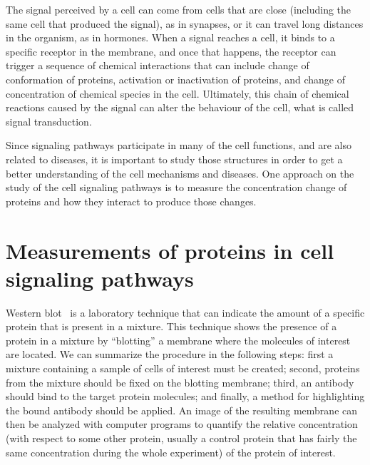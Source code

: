 The signal perceived by a cell can come from cells that are close 
(including the same cell that produced the signal), as in synapses, or 
it can travel long distances in the organism, as in hormones. When a 
signal reaches a cell, it binds to a specific receptor in the membrane,
and once that happens, the receptor can trigger a sequence of chemical 
interactions that can include change of conformation of proteins, 
activation or inactivation of proteins, and change of concentration of
chemical species in the cell. Ultimately, this chain of chemical 
reactions caused by the signal can alter the behaviour of the cell, what 
is called signal transduction.

Since signaling pathways participate in many of the cell functions, and 
are also related to diseases, it is important to study those structures
in order to get a better understanding of the cell mechanisms and 
diseases. One approach on the study of the cell signaling pathways is to 
measure the concentration change of proteins and how they interact to
produce those changes.

\section{Measurements of proteins in cell signaling pathways}
\label{sec:fund_concepts:measurements}
Western blot~\cite{Towbin1979} is a laboratory technique that can 
indicate the amount of a specific protein that is present in a mixture. 
This technique shows the presence of a protein in a mixture by 
``blotting'' a membrane where the molecules of interest are located. We 
can summarize the procedure in the following steps: first a mixture 
containing a sample of cells of interest must be created; 
second, proteins from the mixture should be fixed on the blotting 
membrane; third, an antibody should bind to the target protein 
molecules; and finally, a method for highlighting the bound antibody 
should be applied. An image of the resulting membrane can then be 
analyzed with computer programs to quantify the relative concentration 
(with respect to some other protein, usually a control protein that has 
fairly the same concentration during the whole experiment) of the 
protein of interest.

